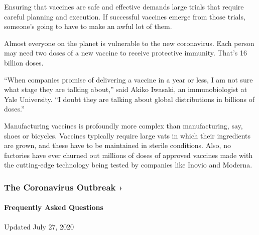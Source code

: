 Ensuring that vaccines are safe and effective demands large trials that
require careful planning and execution. If successful vaccines emerge
from those trials, someone's going to have to make an awful lot of them.

Almost everyone on the planet is vulnerable to the new coronavirus. Each
person may need two doses of a new vaccine to receive protective
immunity. That's 16 billion doses.

``When companies promise of delivering a vaccine in a year or less, I am
not sure what stage they are talking about,'' said Akiko Iwasaki, an
immunobiologist at Yale University. ``I doubt they are talking about
global distributions in billions of doses.''

Manufacturing vaccines is profoundly more complex than manufacturing,
say, shoes or bicycles. Vaccines typically require large vats in which
their ingredients are grown, and these have to be maintained in sterile
conditions. Also, no factories have ever churned out millions of doses
of approved vaccines made with the cutting-edge technology being tested
by companies like Inovio and Moderna.

\href{https://www.nytimes.com/news-event/coronavirus?action=click\&pgtype=Article\&state=default\&region=MAIN_CONTENT_3\&context=storylines_faq}{}

\hypertarget{the-coronavirus-outbreak-}{%
\subsubsection{The Coronavirus Outbreak
›}\label{the-coronavirus-outbreak-}}

\hypertarget{frequently-asked-questions}{%
\paragraph{Frequently Asked
Questions}\label{frequently-asked-questions}}

Updated July 27, 2020

